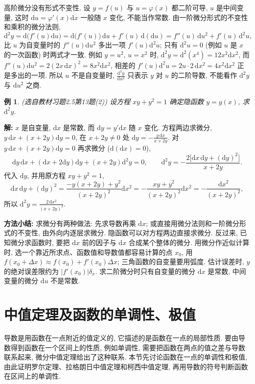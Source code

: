 \documentclass[UTF8,openany]{ctexbook}
\theoremstyle{chinesetextbook}
\newtheorem{example}{例}[section]
\newenvironment{cnsolution}{\par\indent\textbf{解:} \ignorespaces}{\par}
\newcommand{\dd}{\mathrm d}
\begin{document}
高阶微分没有形式不变性. 设 $y=f(u)$ 与 $u=\varphi(x)$ 都二阶可导, $u$ 是中间变量, 这时 $\dd u=\varphi'(x)\dd x$ 一般随 $x$ 变化, 不能当作常数. 由一阶微分形式的不变性和乘积的微分法则,
\[
\dd^2y=\dd\bigl(f'(u)\dd u\bigr)=\dd\bigl(f'(u)\bigr)\,\dd u+f'(u)\,\dd(\dd u)=f''(u)\,\dd u^2+f'(u)\,\dd^2u,
\]
比 $u$ 为自变量时的 $f''(u)\dd u^2$ 多出一项 $f'(u)\dd^2u$; 只有 $\dd^2u=0$ (例如 $u$ 是 $x$ 的一次函数) 时两式才一致. 例如 $y=u^2$, $u=x^2$ 时, $\dd^2y=\dd^2(x^4)=12x^2\dd x^2$, 而 $f''(u)\dd u^2=2(2x\,\dd x)^2=8x^2\dd x^2$, 相差的 $f'(u)\dd^2u=2u\cdot2\,\dd x^2=4x^2\dd x^2$ 正是多出的一项. 所以 $u$ 不是自变量时, $\displaystyle\frac{\dd^2y}{\dd u^2}$ 只表示 $y$ 对 $u$ 的二阶导数, 不能看作 $\dd^2y$ 与 $\dd u^2$ 之商.
\begin{example}\label{ex:c2-h5-13}
\textnormal{(选自教材习题2.5第13题(2))} 设方程 $xy+y^2=1$ 确定隐函数 $y=y(x)$, 求 $\dd^2y$.
\end{example}
\begin{cnsolution}
$x$ 是自变量, $\dd x$ 是常数, 而 $\dd y=y'\dd x$ 随 $x$ 变化. 方程两边求微分, $y\,\dd x+(x+2y)\dd y=0$, 在 $x+2y\ne0$ 处 $\displaystyle\dd y=-\frac{y\,\dd x}{x+2y}$. 对 $y\,\dd x+(x+2y)\dd y=0$ 再求微分 ($\dd(\dd x)=0$),
\[
\dd y\,\dd x+(\dd x+2\dd y)\dd y+(x+2y)\dd^2y=0,\qquad\dd^2y=-\frac{2\bigl[\dd x\,\dd y+(\dd y)^2\bigr]}{x+2y}.
\]
代入 $\dd y$, 并用原方程 $xy+y^2=1$,
\[
\dd x\,\dd y+(\dd y)^2=\frac{-y(x+2y)+y^2}{(x+2y)^2}\dd x^2=-\frac{xy+y^2}{(x+2y)^2}\dd x^2=-\frac{\dd x^2}{(x+2y)^2},
\]
所以 $\displaystyle\dd^2y=\frac{2\,\dd x^2}{(x+2y)^3}$.
\end{cnsolution}
\par\indent\textbf{方法小结:} 求微分有两种做法: 先求导数再乘 $\dd x$; 或直接用微分法则和一阶微分形式的不变性, 由外向内逐层求微分. 隐函数可以对方程两边直接求微分. 反过来, 已知微分求函数时, 要把 $\dd x$ 前的因子与 $\dd x$ 合成某个整体的微分. 用微分作近似计算时, 选一个靠近所求点、函数值和导数值都容易计算的点 $x_0$, 用 $f(x_0+\Delta x)\approx f(x_0)+f'(x_0)\Delta x$; 三角函数的自变量要用弧度. 估计误差时, $y$ 的绝对误差限约为 $|f'(x_0)|\delta_x$. 求二阶微分时只有自变量的微分 $\dd x$ 是常数, 中间变量的微分 $\dd u$ 不是常数.
\section{中值定理及函数的单调性、极值}
导数是用函数在一点附近的值定义的, 它描述的是函数在一点的局部性质. 要由导数得到函数在一个区间上的性质, 例如单调性, 需要把函数在两点的值之差与导数联系起来, 微分中值定理给出了这种联系. 本节先讨论函数在一点的单调性和极值, 由此证明罗尔定理、拉格朗日中值定理和柯西中值定理, 再用导数的符号判断函数在区间上的单调性.
\end{document}

